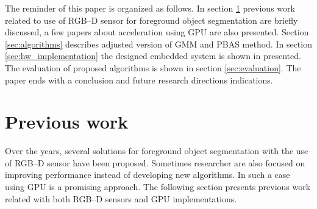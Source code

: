 \documentclass[b5paper,10pt,twoside]{article}
\begin{document}
{%

The reminder of this paper is organized as follows. In section \ref{sec:prev_work} previous work related to use of RGB--D sensor for foreground object segmentation are briefly discussed, a few papers about acceleration using GPU are also presented. Section \ref{sec:algorithms} describes adjusted version of GMM and PBAS method. In section \ref{sec:hw_implementation} the designed embedded system is shown in presented. The evaluation of proposed algorithms is shown in section \ref{sec:evaluation}. The paper ends with a conclusion and future research directions indications.


\section{Previous work}
\label{sec:prev_work}

Over the years, several solutions for foreground object segmentation with the use of RGB--D sensor have been proposed. Sometimes researcher are also focused on improving performance instead of developing new algorithms. In such a case using GPU is a promising approach. The following section presents previous work related with both RGB--D sensors and GPU implementations.

}
\end{document}

